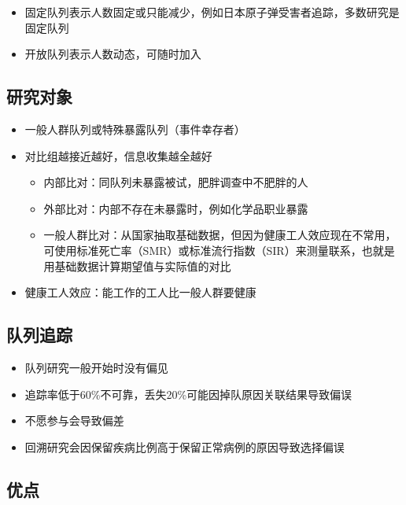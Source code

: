 \documentclass[]{book}
\providecommand{\tightlist}{%
  \setlength{\itemsep}{0pt}\setlength{\parskip}{0pt}}
\begin{document}
\begin{itemize}
\tightlist
\item
  固定队列表示人数固定或只能减少，例如日本原子弹受害者追踪，多数研究是固定队列
\item
  开放队列表示人数动态，可随时加入
\end{itemize}

\hypertarget{ux7814ux7a76ux5bf9ux8c61-1}{%
\subsection{研究对象}\label{ux7814ux7a76ux5bf9ux8c61-1}}

\begin{itemize}
\tightlist
\item
  一般人群队列或特殊暴露队列（事件幸存者）
\item
  对比组越接近越好，信息收集越全越好

  \begin{itemize}
  \tightlist
  \item
    内部比对：同队列未暴露被试，肥胖调查中不肥胖的人
  \item
    外部比对：内部不存在未暴露时，例如化学品职业暴露
  \item
    一般人群比对：从国家抽取基础数据，但因为健康工人效应现在不常用，可使用标准死亡率（SMR）或标准流行指数（SIR）来测量联系，也就是用基础数据计算期望值与实际值的对比
  \end{itemize}
\item
  健康工人效应：能工作的工人比一般人群要健康
\end{itemize}

\hypertarget{ux961fux5217ux8ffdux8e2a}{%
\subsection{队列追踪}\label{ux961fux5217ux8ffdux8e2a}}

\begin{itemize}
\tightlist
\item
  队列研究一般开始时没有偏见
\item
  追踪率低于60\%不可靠，丢失20\%可能因掉队原因关联结果导致偏误
\item
  不愿参与会导致偏差
\item
  回溯研究会因保留疾病比例高于保留正常病例的原因导致选择偏误
\end{itemize}

\hypertarget{ux4f18ux70b9}{%
\subsection{优点}\label{ux4f18ux70b9}}
\end{document}
